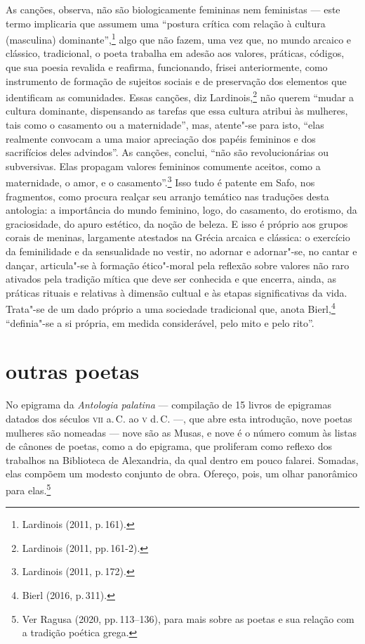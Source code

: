 As canções, observa, não são biologicamente femininas nem feministas --- este termo implicaria que assumem uma “postura crítica com relação à cultura (masculina) dominante”,\footnote{Lardinois (2011, p.\,161).} algo que não fazem, uma vez que, no mundo arcaico e clássico, tradicional, o poeta trabalha em adesão aos valores, práticas, códigos, que sua poesia revalida e reafirma, funcionando, frisei anteriormente, como instrumento de formação de sujeitos sociais e de preservação dos elementos que identificam as comunidades. Essas canções, diz Lardinois,\footnote{Lardinois (2011, pp.\,161-2).} não querem “mudar a cultura dominante, dispensando as tarefas que essa cultura atribui às mulheres, tais como o casamento ou a maternidade”, mas, atente"-se para isto, “elas realmente convocam a uma maior apreciação dos papéis femininos e dos sacrifícios deles advindos”. As canções, conclui, “não são revolucionárias ou subversivas. Elas propagam valores femininos comumente aceitos, como a maternidade, o amor, e o casamento”.\footnote{Lardinois (2011, p.\,172).} Isso tudo é patente em Safo, nos fragmentos, como procura realçar seu arranjo temático nas traduções desta antologia: a importância do mundo feminino, logo, do casamento, do erotismo, da graciosidade, do apuro estético, da noção de beleza. E isso é próprio aos grupos corais de meninas, largamente atestados na Grécia arcaica e clássica: o exercício da feminilidade e da sensualidade no vestir, no adornar e adornar"-se, no cantar e dançar, articula"-se à formação ético"-moral pela reflexão sobre valores não raro ativados pela tradição mítica que deve ser conhecida e que encerra, ainda, as práticas rituais e relativas à dimensão cultual e às etapas significativas da vida. Trata"-se de um dado próprio a uma sociedade tradicional que, anota Bierl,\footnote{Bierl (2016, p.\,311).} “definia"-se a si própria, em medida considerável, pelo mito e pelo rito”. 


\section*{outras poetas}

No epigrama da \emph{Antologia palatina} --- compilação de 15 livros de
epigramas datados dos séculos \textsc{vii} a.\,C. ao \textsc{v} d.\,C. ---, que abre esta introdução,
nove poetas mulheres são nomeadas --- nove são as Musas, e nove é o número comum
às listas de cânones de poetas, como a do epigrama, que proliferam como reflexo
dos trabalhos na Biblioteca de Alexandria, da qual dentro em pouco falarei.
Somadas, elas compõem um modesto conjunto de obra.
Ofereço, pois, um olhar panorâmico para elas.\footnote{Ver Ragusa (2020, pp.\,113--136), para mais sobre as poetas e sua relação com a tradição poética grega.}

